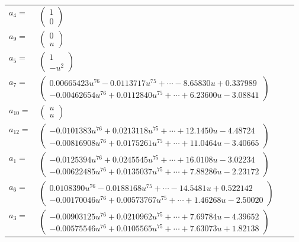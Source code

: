\documentclass[1p]{elsarticle_modified}
\theoremstyle{definition}
\begin{document}
\begin{tabular}{m{7pt} m{180pt} m{7pt} m{180pt} }
\flushright $a_{4}=$&$\begin{pmatrix}1\\0\end{pmatrix}$ \\
\flushright $a_{9}=$&$\begin{pmatrix}0\\u\end{pmatrix}$ \\
\flushright $a_{5}=$&$\begin{pmatrix}1\\- u^2\end{pmatrix}$ \\
\flushright $a_{7}=$&$\begin{pmatrix}0.00665423 u^{76}-0.0113717 u^{75}+\cdots-8.65830 u+0.337989\\-0.00462654 u^{76}+0.0112840 u^{75}+\cdots+6.23600 u-3.08841\end{pmatrix}$ \\
\flushright $a_{10}=$&$\begin{pmatrix}u\\u\end{pmatrix}$ \\
\flushright $a_{12}=$&$\begin{pmatrix}-0.0101383 u^{76}+0.0213118 u^{75}+\cdots+12.1450 u-4.48724\\-0.00816908 u^{76}+0.0175261 u^{75}+\cdots+11.0464 u-3.40665\end{pmatrix}$ \\
\flushright $a_{1}=$&$\begin{pmatrix}-0.0125394 u^{76}+0.0245545 u^{75}+\cdots+16.0108 u-3.02234\\-0.00622485 u^{76}+0.0135037 u^{75}+\cdots+7.88286 u-2.23172\end{pmatrix}$ \\
\flushright $a_{6}=$&$\begin{pmatrix}0.0108390 u^{76}-0.0188168 u^{75}+\cdots-14.5481 u+0.522142\\-0.00170046 u^{76}+0.00573767 u^{75}+\cdots+1.46268 u-2.50020\end{pmatrix}$ \\
\flushright $a_{3}=$&$\begin{pmatrix}-0.00903125 u^{76}+0.0210962 u^{75}+\cdots+7.69784 u-4.39652\\-0.00575546 u^{76}+0.0105565 u^{75}+\cdots+7.63073 u+1.82138\end{pmatrix}$ \\

\end{tabular}
\end{document}
